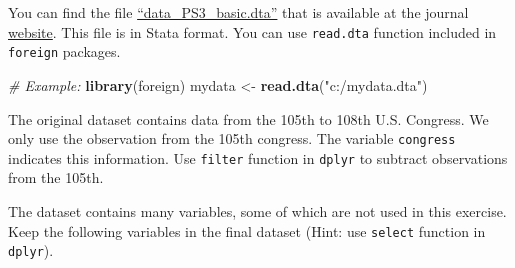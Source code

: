 \documentclass[]{book}
\newenvironment{Shaded}{\begin{snugshade}}{\end{snugshade}}
\newcommand{\KeywordTok}[1]{\textcolor[rgb]{0.13,0.29,0.53}{\textbf{#1}}}
\newcommand{\StringTok}[1]{\textcolor[rgb]{0.31,0.60,0.02}{#1}}
\newcommand{\CommentTok}[1]{\textcolor[rgb]{0.56,0.35,0.01}{\textit{#1}}}
\newcommand{\NormalTok}[1]{#1}
\begin{document}
You can find the file
\href{data_PS3_basic.dta}{``data\_PS3\_basic.dta''} that is available at
the journal
\href{https://www.aeaweb.org/articles?id=10.1257/aer.98.1.311}{website}.
This file is in Stata format. You can use \texttt{read.dta} function
included in \texttt{foreign} packages.

\begin{Shaded}
\begin{Highlighting}[]
\CommentTok{# Example: }
\KeywordTok{library}\NormalTok{(foreign)}
\NormalTok{mydata <-}\StringTok{ }\KeywordTok{read.dta}\NormalTok{(}\StringTok{"c:/mydata.dta"}\NormalTok{)}
\end{Highlighting}
\end{Shaded}

The original dataset contains data from the 105th to 108th U.S.
Congress. We only use the observation from the 105th congress. The
variable \texttt{congress} indicates this information. Use
\texttt{filter} function in \texttt{dplyr} to subtract observations from
the 105th.

The dataset contains many variables, some of which are not used in this
exercise. Keep the following variables in the final dataset (Hint: use
\texttt{select} function in \texttt{dplyr}).
\end{document}
